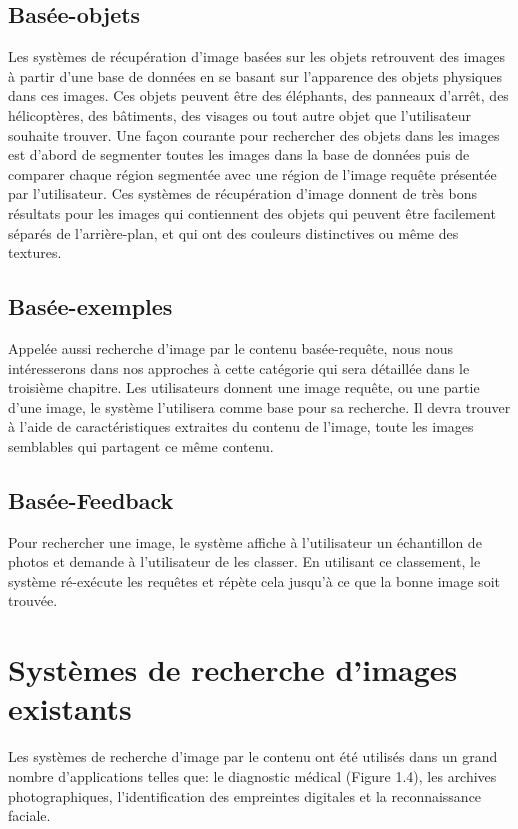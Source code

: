 \subsection{Basée-objets}
	
	Les systèmes de récupération d'image basées sur les objets retrouvent des images à partir d'une base de données en se basant sur l'apparence des objets physiques dans ces images. Ces objets peuvent être des éléphants, des panneaux d'arrêt, des hélicoptères, des bâtiments, des visages ou tout autre objet que l'utilisateur souhaite trouver. Une façon courante pour rechercher des objets dans les images est d'abord de segmenter toutes les images dans la base de données puis de comparer chaque région segmentée avec une région de l'image requête présentée par l'utilisateur. Ces systèmes de récupération d'image donnent de très bons résultats pour les images qui contiennent des objets qui peuvent être facilement séparés de l'arrière-plan, et qui ont des couleurs distinctives ou même des textures.

\subsection{Basée-exemples}

	Appelée aussi recherche d'image par le contenu basée-requête, nous nous intéresserons dans nos approches à cette catégorie qui sera détaillée dans le troisième chapitre. Les utilisateurs donnent une image requête, ou une partie d'une image, le système l'utilisera comme base pour sa recherche. Il devra trouver à l'aide de caractéristiques extraites du contenu de l'image, toute les images semblables qui partagent ce même contenu.


\subsection{Basée-Feedback}
	Pour rechercher une image, le système affiche à l'utilisateur un échantillon de photos et demande à l'utilisateur de les classer. En utilisant ce classement, le système ré-exécute les requêtes et répète cela jusqu'à ce que la bonne image soit trouvée.

\section{Systèmes de recherche d'images existants}

	Les systèmes de recherche d'image par le contenu ont été utilisés dans un grand nombre d'applications telles que: le diagnostic médical (Figure 1.4), les archives photographiques, l'identification des empreintes digitales et la reconnaissance faciale.


